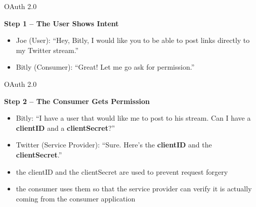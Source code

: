 \documentclass[pdf]{beamer}
\begin{document}
\begin{frame}{OAuth 2.0}

\textbf{Step 1 – The User Shows Intent}

\begin{itemize}
\item
Joe (User): “Hey, Bitly, I would like you to be able to post links directly to my Twitter stream.”
\newline

\item
Bitly (Consumer): “Great! Let me go ask for permission.”

\end{itemize}
\end{frame}



\begin{frame}{OAuth 2.0}

\textbf{Step 2 – The Consumer Gets Permission}

\begin{itemize}
\item
Bitly: “I have a user that would like me to post to his stream. Can I have a \textbf{clientID} and a \textbf{clientSecret}?”
\newline

\item
Twitter (Service Provider): “Sure.  Here’s the \textbf{clientID} and the \textbf{clientSecret}.”
\newline

\item
the clientID and the clientSecret are used to prevent request forgery

\item
the consumer uses them so that the service provider can verify it is actually coming from the consumer application

\end{itemize}
\end{frame}
\end{document}

